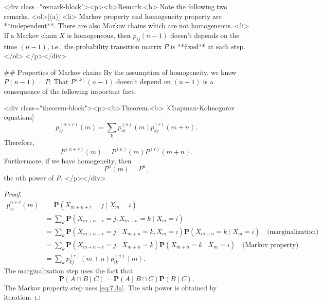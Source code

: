 <div class="remark-block"><p><b>Remark.<b> 
Note the following two remarks.
<ol>[(a)]
    <li> Markov property and homogeneity property are **independent**. There are also Markov chains which are not homogeneous. 
    <li> If a Markov chain $X$ is homogeneous, then $p_{ij}(n-1)$ doesn't depends on the time $(n-1)$, i.e., the probability transition matrix $P$ is **fixed** at each step.
</ol>
</p></div>

## Properties of Markov chains
By the assumption of homogeneity, we know $P(n-1) = P$. That $P^{(k)}(n-1)$ doesn't depend on $(n-1)$ is a consequence of the following important fact.

<div class="theorem-block"><p><b>Theorem.<b> [Chapman-Kolmogorov equations]
$$\begin{equation}
    p_{ij}^{(n+r)}(m) = \sum_{k} p_{ik}^{(n)}(m) p_{kj}^{(r)}(m+n).
\end{equation}$$
Therefore, 
$$\begin{equation}
    P^{(n+r)}(m) = P^{(n)}(m) P^{(r)}(m+n).
\end{equation}$$
Furthermore, if we have homogeneity, then 
$$\begin{equation}
    P^{n}(m) = P^n,
\end{equation}$$
the $n$th power of $P$.
</p></div>

\begin{proof}
    $$\begin{equation}
        \begin{split}
            p_{ij}^{n+r}(m) &= \mathbf{P}(X_{m+n+r} = j \;\vert\; X_m = i) \\ 
            &= \sum_{k} \mathbf{P}(X_{m+n+r} = j, X_{m+n} = k \;\vert\; X_m = i) \\
            &= \sum_{k} \mathbf{P}(X_{m+n+r} = j \;\vert\; X_{m+n} = k, X_m = i) \mathbf{P}(X_{m+n} = k \;\vert\; X_m = i) \quad \text{(marginalization)} \\
            &= \sum_{k} \mathbf{P}(X_{m+n+r} = j \;\vert\; X_{m+n} = k) \mathbf{P}(X_{m+n} = k \;\vert\; X_m = i) \quad \text{(Markov property)} \\
            &= \sum_{k} p_{kj}^{(r)}(m+n) p_{ik}^{(n)}(m) . 
        \end{split}
    \end{equation}$$
    The marginalization step uses the fact that 
    $$\begin{equation}
        \mathbf{P}(A \cap B \;\vert\; C) = \mathbf{P}(A \;\vert\; B \cap C) \mathbf{P}(B \;\vert\; C).
    \end{equation}$$
    The Markov property step uses \eqref{eq:7.3a}. The $n$th power is obtained by iteration.
\end{proof}

